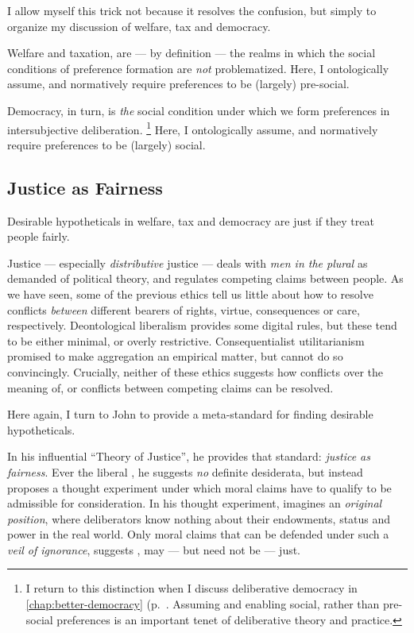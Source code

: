 \begin{enumerate}
	I allow myself this trick not because it resolves the confusion, but simply to organize my discussion of welfare, tax and democracy.

	Welfare and taxation, are --- by definition --- the realms in which the social conditions of preference formation are \emph{not} problematized.
	Here, I ontologically assume, and normatively require preferences to be (largely) pre-social.

	Democracy, in turn, is \emph{the} social condition under which we form preferences in intersubjective deliberation.
	\footnote{
		I return to this distinction when I discuss deliberative democracy in \autoref{chap:better-democracy} (p.~\pageref{chap:better-democracy}.
		Assuming and enabling social, rather than pre-social preferences is an important tenet of deliberative theory and practice.
	}
	Here, I ontologically assume, and normatively require preferences to be (largely) social.
\end{enumerate}

\subsection[Fair]{Justice as Fairness}
	\label{sec:fair}
Desirable hypotheticals in welfare, tax and democracy are just if they treat people fairly.

Justice --- especially \emph{distributive} justice --- deals with \emph{men in the plural} as \citeauthor{Arendt1958} demanded of political theory, and regulates competing claims between people.
As we have seen, some of the previous ethics tell us little about how to resolve conflicts \emph{between} different bearers of rights, virtue, consequences or care, respectively.
Deontological liberalism provides some digital rules, but these tend to be either minimal, or overly restrictive.
Consequentialist utilitarianism promised to make aggregation an empirical matter, but cannot do so convincingly.
Crucially, neither of these ethics suggests how conflicts over the meaning of, or conflicts between competing claims can be resolved.

Here again, I turn to John \citeauthor{Rawls-1971} to provide a meta-standard for finding desirable hypotheticals.

In his influential ``Theory of Justice'', he provides that standard:
\emph{justice as fairness}.
Ever the liberal \citep[and similar to above-mentioned][]{Cohen-1989-aa}, he suggests \emph{no} definite desiderata, but instead proposes a thought experiment under which moral claims have to qualify to be admissible for consideration.
In his thought experiment, \citeauthor{Rawls-1971} imagines an \emph{original position}, where deliberators know nothing about their endowments, status and power in the real world.
Only moral claims that can be defended under such a \emph{veil of ignorance}, suggests \citeauthor{Rawls-1971}, may --- but need not be --- just.

